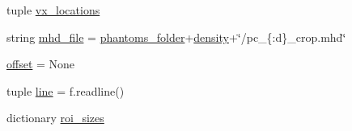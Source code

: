 \begin{DoxyCompactItemize}
tuple \hyperlink{namespacerun__pipeline_a6b679545160329ef5ae04905e0fc0f70}{vx\-\_\-locations}
\item 
string \hyperlink{namespacerun__pipeline_abaa1ba9de8ccf7d14b2ca397db5de9e9}{mhd\-\_\-file} = \hyperlink{namespacerun__pipeline_ad2c440e7163ff7674972217024c82f44}{phantoms\-\_\-folder}+\hyperlink{namespacerun__pipeline_ae61cb02024dfca7d93506ffb8033e069}{density}+\char`\"{}/pc\-\_\-\{\-:d\}\-\_\-crop.\-mhd\char`\"{}
\item 
\hyperlink{namespacerun__pipeline_a82244d07ac01d28c7380290c904cadd7}{offset} = None
\item 
tuple \hyperlink{namespacerun__pipeline_aaaa6fb70bbde47bf610f101b1c7365ba}{line} = f.\-readline()
\item 
dictionary \hyperlink{namespacerun__pipeline_acbbe35ae536f40bcd740b4fa98cd53a1}{roi\-\_\-sizes}
\end{DoxyCompactItemize}


